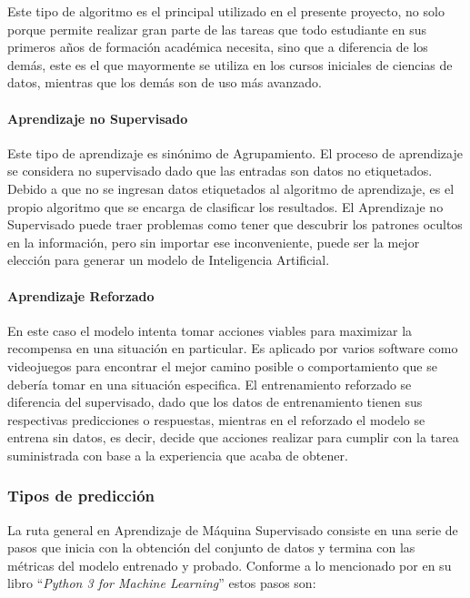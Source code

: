 Este tipo de algoritmo es el principal utilizado en el presente proyecto, no solo porque permite realizar gran parte de las tareas que todo estudiante en sus primeros años de formación académica necesita, sino que a diferencia de los demás, este es el que mayormente se utiliza en los cursos iniciales de ciencias de datos, mientras que los demás son de uso más avanzado.

\paragraph{Aprendizaje no Supervisado} Este tipo de aprendizaje es sinónimo de Agrupamiento. El proceso de aprendizaje se considera no supervisado dado que las entradas son datos no etiquetados. Debido a que no se ingresan datos etiquetados al algoritmo de aprendizaje, es el propio algoritmo que se encarga de clasificar los resultados. El Aprendizaje no Supervisado puede traer problemas como tener que descubrir los patrones ocultos en la información, pero sin importar ese inconveniente, puede ser la mejor elección para generar un modelo de Inteligencia Artificial.

\paragraph{Aprendizaje Reforzado} En este caso el modelo intenta tomar acciones viables para maximizar la recompensa en una situación en particular. Es aplicado por varios software como videojuegos para encontrar el mejor camino posible o comportamiento que se debería tomar en una situación especifica. El entrenamiento reforzado se diferencia del supervisado, dado que los datos de entrenamiento tienen sus respectivas predicciones o respuestas, mientras en el reforzado el modelo se entrena sin datos, es decir, decide que acciones realizar para cumplir con la tarea suministrada con base a la experiencia que acaba de obtener.

\subsubsection{Tipos de predicción}
La ruta general en Aprendizaje de Máquina Supervisado consiste en una serie de pasos que inicia con la obtención del conjunto de datos y termina con las métricas del modelo entrenado y probado. Conforme a lo mencionado por \textcite{oswald2020python} en su libro ``\textit{Python 3 for Machine Learning}'' estos pasos son:

